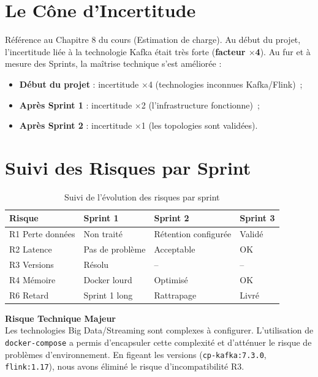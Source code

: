 \section{Le Cône d'Incertitude}

Référence au Chapitre 8 du cours (Estimation de charge). Au début du projet, l'incertitude liée à la technologie Kafka était très forte (\textbf{facteur $\times$4}). Au fur et à mesure des Sprints, la maîtrise technique s'est améliorée :

\begin{itemize}
    \item \textbf{Début du projet} : incertitude $\times$4 (technologies inconnues Kafka/Flink)~;
    \item \textbf{Après Sprint 1} : incertitude $\times$2 (l'infrastructure fonctionne)~;
    \item \textbf{Après Sprint 2} : incertitude $\times$1 (les topologies sont validées).
\end{itemize}

\section{Suivi des Risques par Sprint}

\begin{table}[H]
\centering
\begin{tabularx}{\textwidth}{L{3cm} C{3cm} C{3cm} C{3cm}}
\toprule
\textbf{\color{primarycolor}Risque} &
\textbf{\color{primarycolor}Sprint 1} &
\textbf{\color{primarycolor}Sprint 2} &
\textbf{\color{primarycolor}Sprint 3} \\
\midrule
R1 Perte données & Non traité & Rétention configurée & Validé \\
\addlinespace[0.1cm]
R2 Latence & Pas de problème & Acceptable & OK \\
\addlinespace[0.1cm]
R3 Versions & Résolu & -- & -- \\
\addlinespace[0.1cm]
R4 Mémoire & Docker lourd & Optimisé & OK \\
\addlinespace[0.1cm]
R6 Retard & Sprint 1 long & Rattrapage & Livré \\
\bottomrule
\end{tabularx}
\caption{Suivi de l'évolution des risques par sprint}
\end{table}

\begin{warningbox}
    \textbf{\textcolor{red!70!black}{\large Risque Technique Majeur}}\\[0.3cm]
    Les technologies Big Data/Streaming sont complexes à configurer. L'utilisation de \texttt{docker-compose} a permis d'encapsuler cette complexité et d'atténuer le risque de problèmes d'environnement. En figeant les versions (\texttt{cp-kafka:7.3.0}, \texttt{flink:1.17}), nous avons éliminé le risque d'incompatibilité R3.
\end{warningbox}
